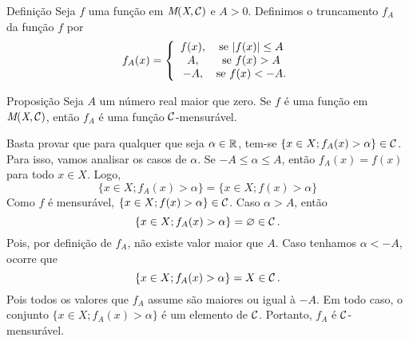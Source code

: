 \begin{env}{Definição}
	Seja $f$ uma função em $\operatorname{\textit{M}(\textit{X}, \mathcal{C} )}$ e $A > 0$.
	Definimos o truncamento $f_A$ da função $f$ por
	$$ f_A(x) =
	\left\{\begin{array}{cc}
		f(x), & \textrm{se\ } |f(x)| \leq A \\
		A, & \textrm{se\ } f(x) > A \\
		-A, & \textrm{se\ } f(x) < -A.
	\end{array}\right.
	\vspace{-0.4cm}
	$$
\end{env}
\begin{env}{Proposição}
	\label{prop:truncamento-mensurável}
	Seja $A$ um número real maior que zero.
	Se $f$ é uma função em $\operatorname{\textit{M}(\textit{X}, \mathcal{C} )}$, então $f_A$ é uma função $\operatorname{\mathcal{C}}$-mensurável.
\end{env}
\begin{prova}
	Basta provar que para qualquer que seja $\alpha \in \mathbb{R}$, tem-se $\{x \in X; f_A(x) > \alpha\} \in \operatorname{\mathcal{C}}$.
	Para isso, vamos analisar os casos de $\alpha$.
	Se $-A \leq \alpha \leq A$, então $f_A(x) = f(x)$ para todo $x \in X$.
	Logo, 
	$$
	\{x \in X; f_A(x) > \alpha \} = \{x \in X; f(x) > \alpha \}
	$$
	Como $f$ é mensurável, $\{x \in X; f(x) > \alpha \} \in \operatorname{\mathcal{C}}$.
	Caso $\alpha > A$, então
	$$
	\{x \in X; f_A(x) > \alpha \} = \varnothing \in \operatorname{\mathcal{C}}.
	$$
	Pois, por definição de $f_A$, não existe valor maior que $A$.
	Caso tenhamos $\alpha < -A$, ocorre que
	$$
	\{x \in X; f_A(x) > \alpha \} = X \in \operatorname{\mathcal{C}}.
	$$
	Pois todos os valores que $f_A$ assume são maiores ou igual à $-A$.
	Em todo caso, o conjunto $\{x \in X; f_A(x) > \alpha\}$ é um elemento de $\operatorname{\mathcal{C}}$.
	Portanto, $f_A$ é $\operatorname{\mathcal{C}}$-mensurável. 
\end{prova}

